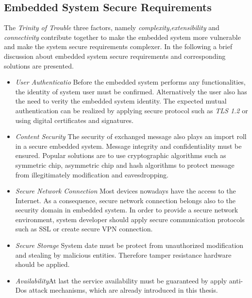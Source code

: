 \subsection{Embedded System Secure Requirements}
The \emph{Trinity of Trouble}\cite{embedded_secure} three factors, namely \emph{complexity},\emph{extensibility} and \emph{connectivity} contribute together to make the embedded system more vulnerable and make the  system secure requirements complexer.
In the following a brief discussion about embedded system secure requirements and corresponding solutions are presented\cite{embedded_secure}.
\begin{itemize}
\item \emph{User Authenticatio} Before the embedded system performs any functionalities, the identity of system user must be confirmed. Alternatively the user also has the need to verity the embedded system identity. The expected mutual authentication can be realized by applying secure protocol such as \emph{TLS 1.2} or using digital certificates and signatures.
\item \emph{Content Security} The security of exchanged message also plays an import roll in a secure embedded system. Message integrity and confidentiality must be ensured. Popular solutions are to use cryptographic algorithms such as symmetric chip, asymmetric chip and hash algorithms to protect message from illegitimately modification and eavesdropping.
\item \emph{Secure Network Connection} Most devices nowadays have the access to the Internet. As a consequence, secure  network connection belongs also to the security domain in embedded system. In order  to provide a secure network environment, system developer should apply secure communication protocols such as SSL or create secure VPN connection\cite{embedded_secure}.
\item \emph{Secure Storage} System date must be protect from unauthorized modification and stealing by malicious entities. Therefore tamper resistance hardware should be applied.
\item \emph{Availability}At last the service availability must be guaranteed by apply anti-Dos attack mechanisms, which are already introduced in this thesis.
\end{itemize}
